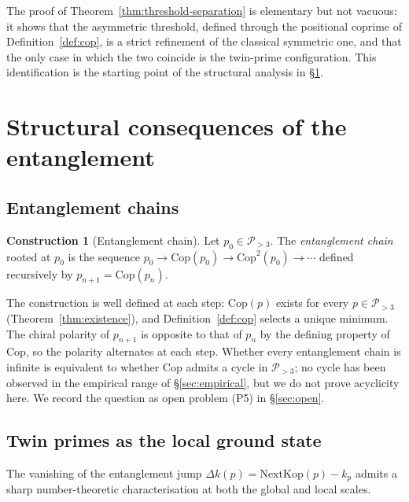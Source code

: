 \documentclass[11pt]{amsart}
\numberwithin{equation}{section}
\newcommand{\cP}{\mathcal{P}}
\newcommand{\NextKop}{\mathrm{NextKop}}
\newcommand{\Cop}{\mathrm{Cop}}
\theoremstyle{plain}
\theoremstyle{definition}
\newtheorem{construction}[theorem]{Construction}
\begin{document}
The proof of Theorem~\ref{thm:threshold-separation} is elementary but
not vacuous: it shows that the asymmetric threshold, defined through
the positional coprime of Definition~\ref{def:cop}, is a strict
refinement of the classical symmetric one, and that the only case in
which the two coincide is the twin-prime configuration. This
identification is the starting point of the structural analysis in
\S\ref{sec:gemelos}.

\section{Structural consequences of the entanglement}
\label{sec:gemelos}

\subsection{Entanglement chains}
\label{subsec:chains}

\begin{construction}[Entanglement chain]
\label{constr:chains}
Let $p_0\in\cP_{>3}$. The \emph{entanglement chain} rooted at $p_0$ is
the sequence $p_0\to\Cop(p_0)\to\Cop^2(p_0)\to\cdots$ defined
recursively by $p_{n+1}=\Cop(p_n)$.
\end{construction}

The construction is well defined at each step: $\Cop(p)$ exists for
every $p\in\cP_{>3}$ (Theorem~\ref{thm:existence}), and
Definition~\ref{def:cop} selects a unique minimum. The chiral polarity
of $p_{n+1}$ is opposite to that of $p_n$ by the defining property of
$\Cop$, so the polarity alternates at each step. Whether every
entanglement chain is infinite is equivalent to whether $\Cop$ admits
a cycle in $\cP_{>3}$; no cycle has been observed in the empirical
range of \S\ref{sec:empirical}, but we do not prove acyclicity here.
We record the question as open problem (P5) in \S\ref{sec:open}.

\subsection{Twin primes as the local ground state}
\label{subsec:ground-state}

The vanishing of the entanglement jump $\Delta k(p)=\NextKop(p)-k_p$
admits a sharp number-theoretic characterisation at both the global
and local scales.
\end{document}
